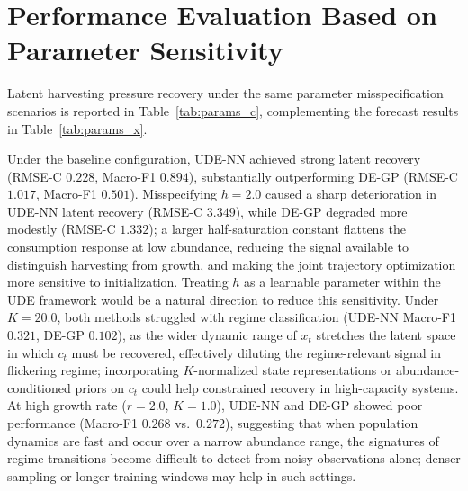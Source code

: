 \documentclass[openacc]{rsproca_new}%
\begin{document}
\section{Performance Evaluation Based on Parameter Sensitivity}
Latent harvesting pressure recovery under the same parameter misspecification scenarios is reported in Table~\ref{tab:params_c}, complementing the forecast results in Table~\ref{tab:params_x}.

Under the baseline configuration, UDE-NN achieved strong latent recovery (RMSE-C $0.228$, Macro-F1 $0.894$), substantially outperforming DE-GP (RMSE-C $1.017$, Macro-F1 $0.501$). Misspecifying $h=2.0$ caused a sharp deterioration in UDE-NN latent recovery (RMSE-C $3.349$), while DE-GP degraded more modestly (RMSE-C $1.332$); a larger half-saturation constant flattens the consumption response at low abundance, reducing the signal available to distinguish harvesting from growth, and making the joint trajectory optimization more sensitive to initialization. Treating $h$ as a learnable parameter within the UDE framework would be a natural direction to reduce this sensitivity.
% 
Under $K=20.0$, both methods struggled with regime classification (UDE-NN Macro-F1 $0.321$, DE-GP $0.102$), as the wider dynamic range of $x_t$ stretches the latent space in which $c_t$ must be recovered, effectively diluting the regime-relevant signal in flickering regime; incorporating $K$-normalized state representations or abundance-conditioned priors on $c_t$ could help constrained recovery in high-capacity systems. At high growth rate ($r=2.0$, $K=1.0$), UDE-NN and DE-GP showed poor performance (Macro-F1 $0.268$ vs.\ $0.272$), suggesting that when population dynamics are fast and occur over a narrow abundance range, the signatures of regime transitions become difficult to detect from noisy observations alone; denser sampling
or longer training windows may help in such settings.
% 
% 
\end{document}
